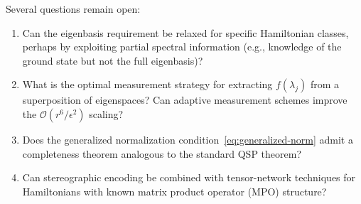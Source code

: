 Several questions remain open:
\begin{enumerate}
	\item Can the eigenbasis requirement be relaxed for specific
	      Hamiltonian classes, perhaps by exploiting partial
	      spectral information (e.g., knowledge of the ground
	      state but not the full eigenbasis)?
	\item What is the optimal measurement strategy for
	      extracting $f(\lambda_j)$ from a superposition of
	      eigenspaces?  Can adaptive measurement schemes improve
	      the $\mathcal{O}(r^6/\epsilon^2)$ scaling?
	\item Does the generalized normalization
	      condition~\eqref{eq:generalized-norm} admit a
	      completeness theorem analogous to the standard QSP
	      theorem?
	\item Can stereographic encoding be combined with
	      tensor-network techniques for Hamiltonians with
	      known matrix product operator (MPO) structure?
\end{enumerate}
